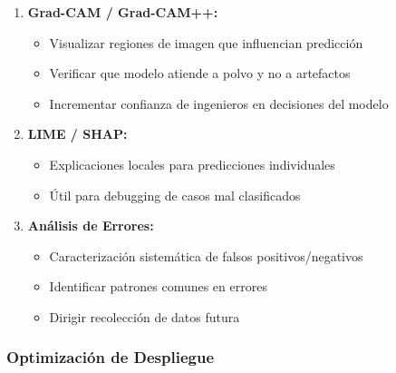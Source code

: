 \documentclass[11pt, a4paper]{article}
\begin{document}
\begin{enumerate}
    \item \textbf{Grad-CAM / Grad-CAM++:}
    \begin{itemize}
        \item Visualizar regiones de imagen que influencian predicción
        \item Verificar que modelo atiende a polvo y no a artefactos
        \item Incrementar confianza de ingenieros en decisiones del modelo
    \end{itemize}
    
    \item \textbf{LIME / SHAP:}
    \begin{itemize}
        \item Explicaciones locales para predicciones individuales
        \item Útil para debugging de casos mal clasificados
    \end{itemize}
    
    \item \textbf{Análisis de Errores:}
    \begin{itemize}
        \item Caracterización sistemática de falsos positivos/negativos
        \item Identificar patrones comunes en errores
        \item Dirigir recolección de datos futura
    \end{itemize}
\end{enumerate}

\subsubsection{Optimización de Despliegue}
\end{document}
